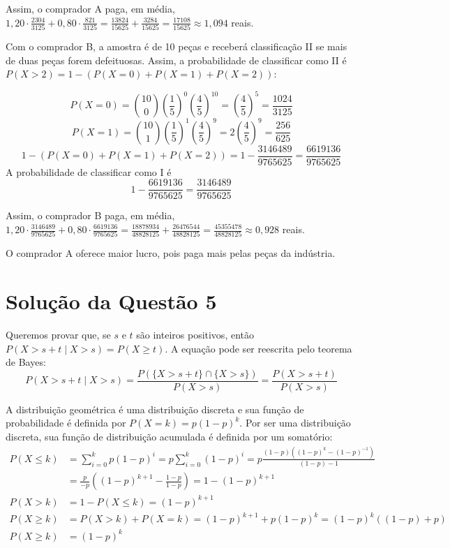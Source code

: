 \documentclass[
	12pt,				%
	openright,			%
	oneside,			%
	a4paper,			%
	english,			%
	brazil,				%
	]{abntex2}
\begin{document}
Assim, o comprador A paga, em média, $1{,}20 \cdot \frac{2304}{3125} + 0{,}80 \cdot \frac{821}{3125} = \frac{13824}{15625} + \frac{3284}{15625} = \frac{17108}{15625} \approx 1{,}094$ reais.

Com o comprador B, a amostra é de 10 peças e receberá classificação II se mais de duas peças forem defeituosas. Assim, a probabilidade de classificar como II é $P(X > 2) = 1 - (P(X = 0) + P(X = 1) + P(X = 2))$: 

$$P(X = 0) = \binom{10}{0}\left(\frac{1}{5}\right)^0 \left(\frac{4}{5}\right)^10 = \left(\frac{4}{5}\right)^5 = \frac{1024}{3125}$$
$$P(X = 1) = \binom{10}{1}\left(\frac{1}{5}\right)^1 \left(\frac{4}{5}\right)^9 = 2\left(\frac{4}{5}\right)^9 = \frac{256}{625}$$
$$1 - (P(X = 0) + P(X = 1) + P(X = 2)) = 1 - \frac{3146489}{9765625} = \frac{6619136}{9765625}$$
A probabilidade de classificar como I é $$1 - \frac{6619136}{9765625} = \frac{3146489}{9765625}$$

Assim, o comprador B paga, em média, $1{,}20 \cdot \frac{3146489}{9765625} + 0{,}80 \cdot \frac{6619136}{9765625} = \frac{18878934}{48828125} + \frac{26476544}{48828125} = \frac{45355478}{48828125} \approx 0{,}928$ reais.

O comprador A oferece maior lucro, pois paga mais pelas peças da indústria.


\section{Solução da Questão 5}


Queremos provar que, se $s$ e $t$ são inteiros positivos, então $P(X > s + t \mid X > s) = P(X \geq t)$. A equação pode ser reescrita pelo teorema de Bayes:
$$P(X > s + t \mid X > s) = \frac{P(\{X > s + t\}\cap \{X > s\})}{P(X > s)} = \frac{P(X > s + t)}{P(X > s)}$$

A distribuição geométrica é uma distribuição discreta e sua função de probabilidade é definida por $P(X = k) = p(1 - p)^k$. Por ser uma distribuição discreta, sua função de distribuição acumulada é definida por um somatório:
\begin{align*}
    P(X \leq k) &= \sum_{i = 0}^{k} p(1 - p)^i = p\sum_{i = 0}^{k} (1 - p)^{i} = p\frac{(1 - p)((1 - p)^{k} - (1 - p)^{-1})}{(1 - p) - 1}\\
    &= \frac{p}{-p}\left((1 - p)^{k+1} - \frac{1 - p}{1 - p}\right) = 1 - (1 - p)^{k + 1}\\
    P(X > k) &= 1 - P(X \leq k) = (1 - p)^{k + 1}\\
    P(X \geq k) &= P(X > k) + P(X = k) = (1 - p)^{k + 1} + p(1 - p)^k = (1 - p)^k((1 - p) + p)\\
    P(X \geq k) &= (1 - p)^k \tag{1}\label{(1-p)^k}
\end{align*}
\end{document}
